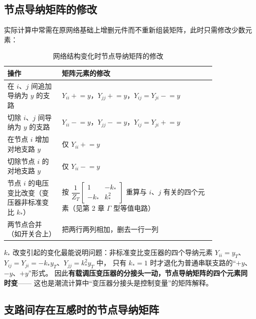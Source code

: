 \subsection{节点导纳矩阵的修改}

实际计算中常需在原网络基础上增删元件而不重新组装矩阵，此时只需修改少数元素：

\begin{table}[htbp]
  \centering
  \caption{网络结构变化时节点导纳矩阵的修改}
  \small
  \begin{tabular}{@{}p{0.22\linewidth}p{0.62\linewidth}@{}}
    \toprule
    操作 & 矩阵元素的修改 \\
    \midrule
    在 $i$、$j$ 间追加导纳为 $y$ 的支路 &
      $Y_{ii}\mathrel{+}=y$，$Y_{jj}\mathrel{+}=y$，$Y_{ij}=Y_{ji}\mathrel{-}=y$ \\
    切除 $i$、$j$ 间导纳为 $y$ 的支路 &
      $Y_{ii}\mathrel{-}=y$，$Y_{jj}\mathrel{-}=y$，$Y_{ij}=Y_{ji}\mathrel{+}=y$ \\
    在节点 $i$ 增加对地支路 $y$ & 仅 $Y_{ii}\mathrel{+}=y$ \\
    切除节点 $i$ 的对地支路 $y$ & 仅 $Y_{ii}\mathrel{-}=y$ \\
    节点 $i$ 的电压变比改变（变压器非标准变比 $k_*$） &
      按 $\dfrac{1}{Z_T}\begin{bmatrix}1&-k_*\\-k_*&k_*^{2}\end{bmatrix}$
      重算与 $i$、$j$ 有关的四个元素（见第 2 章 $\Gamma$ 型等值电路） \\
    两节点合并（如开关合上） & 把两行两列相加，删去一行一列 \\
    \bottomrule
  \end{tabular}
\end{table}

$k_*$ 改变引起的变化最能说明问题：非标准变比变压器的四个导纳元素
$Y_{ii}=y_T$、$Y_{ij}=Y_{ji}=-k_*y_T$、$Y_{jj}=k_*^{2}y_T$ 中，
只有 $k_*=1$ 时才退化为普通串联支路的“$+y$、$-y$、$+y$”形式。
因此\textbf{有载调压变压器的分接头一动，节点导纳矩阵的四个元素同时变}——
这也是潮流计算中“变压器分接头是控制变量”的矩阵解释。

\subsection{支路间存在互感时的节点导纳矩阵}

